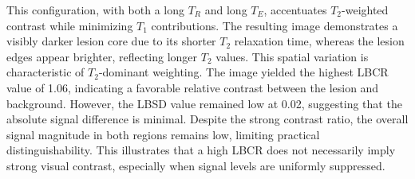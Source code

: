 \documentclass[10pt,a4paper,twoside]{article}
\begin{document}
\begin{itemize}
This configuration, with both a long \( T_R \) and long \( T_E \), accentuates \( T_2 \)-weighted contrast while minimizing \( T_1 \) contributions. The resulting image demonstrates a visibly darker lesion core due to its shorter \( T_2 \) relaxation time, whereas the lesion edges appear brighter, reflecting longer \( T_2 \) values. This spatial variation is characteristic of \( T_2 \)-dominant weighting. The image yielded the highest LBCR value of 1.06, indicating a favorable relative contrast between the lesion and background. However, the LBSD value remained low at 0.02, suggesting that the absolute signal difference is minimal. Despite the strong contrast ratio, the overall signal magnitude in both regions remains low, limiting practical distinguishability. This illustrates that a high LBCR does not necessarily imply strong visual contrast, especially when signal levels are uniformly suppressed.

    



\end{itemize}
\end{document}
